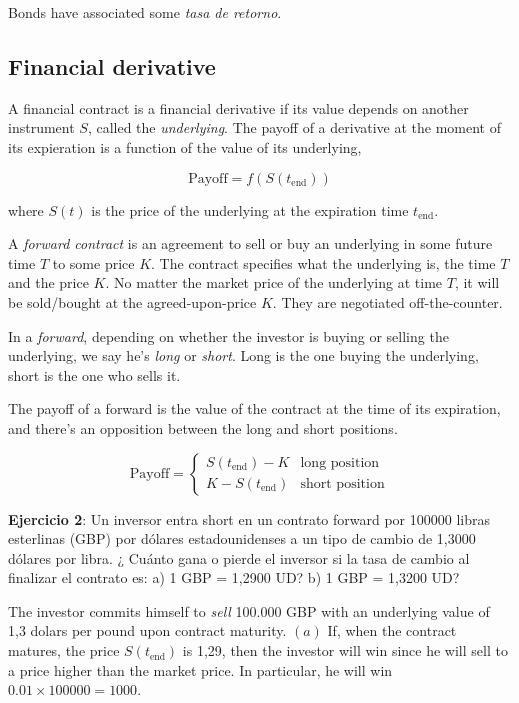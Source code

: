 \documentclass[a4paper, 12pt]{article}
\theoremstyle{definition}
\begin{document}
Bonds have associated some \textit{tasa de retorno}.

\subsection{Financial derivative}

A financial contract is a financial derivative if its value depends on another
instrument $S$, called the \textit{underlying}. The payoff of a derivative at
the moment of its expieration is a function of the value of its underlying, 

\begin{equation}
    \text{Payoff} = f\left( S(t_{\text{end}}) \right) 
\end{equation}

where $S(t)$ is the price of the underlying at the expiration time
$t_{\text{end}}$.

A \textit{forward contract} is an agreement to sell or buy an underlying
in some future time $T$ to some price $K$. The contract specifies what the
underlying is, the time $T$ and the price $K$. No matter the market price of the
underlying at time $T$, it will be sold/bought at the agreed-upon-price $K$.
They are negotiated off-the-counter. 

In a \textit{forward}, depending on whether the investor is buying or selling
the underlying, we say he's \textit{long} or \textit{short}. Long is the one
buying the underlying, short is the one who sells it.

The payoff of a forward is the value of the contract at the time of its
expiration, and there's an opposition between the long and short positions. 

\begin{equation}
    \text{Payoff} = \begin{cases}
        S(t_{\text{end}}) - K & \text{long position}\\ 
        K - S(t_{\text{end}}) & \text{short position}
    \end{cases}
\end{equation}

\pagebreak 

\begin{shaded}
    \textbf{Ejercicio 2}: Un inversor entra short en un contrato forward por 100000 libras
    esterlinas (GBP) por dólares estadounidenses a un tipo de cambio de 1,3000
    dólares por libra. ¿ Cuánto gana o pierde el inversor si la tasa de cambio al
    finalizar el contrato es: a) 1 GBP = 1,2900 UD? b) 1 GBP = 1,3200 UD?
\end{shaded}

The investor commits himself to \textit{sell} 100.000 GBP with an underlying
value of 1,3 dolars per pound upon contract maturity. $(a)$ If, when the
contract matures, the price $S(t_{\text{end}})$ is 1,29, then the investor will
win since he will sell to a price higher than the market price. In particular,
he will win $0.01 \times 100000 = 1000$.
\end{document}
